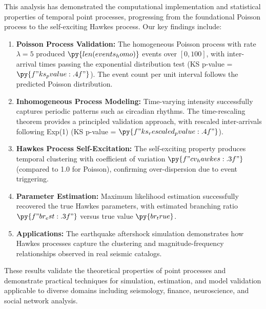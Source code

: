 \documentclass[a4paper, 11pt]{article}
\begin{document}
This analysis has demonstrated the computational implementation and statistical
properties of temporal point processes, progressing from the foundational Poisson
process to the self-exciting Hawkes process. Our key findings include:

\begin{enumerate}
\item \textbf{Poisson Process Validation:} The homogeneous Poisson process with
rate $\lambda = 5$ produced $\py{len(events_homo)}$ events over $[0, 100]$, with
inter-arrival times passing the exponential distribution test (KS p-value =
$\py{f"{ks_pvalue:.4f}"}$). The event count per unit interval follows the predicted
Poisson distribution.

\item \textbf{Inhomogeneous Process Modeling:} Time-varying intensity successfully
captures periodic patterns such as circadian rhythms. The time-rescaling theorem
provides a principled validation approach, with rescaled inter-arrivals following
Exp(1) (KS p-value = $\py{f"{ks_rescaled_pvalue:.4f}"}$).

\item \textbf{Hawkes Process Self-Excitation:} The self-exciting property produces
temporal clustering with coefficient of variation $\py{f"{cv_hawkes:.3f}"}$ (compared
to 1.0 for Poisson), confirming over-dispersion due to event triggering.

\item \textbf{Parameter Estimation:} Maximum likelihood estimation successfully
recovered the true Hawkes parameters, with estimated branching ratio
$\py{f"{br_est:.3f}"}$ versus true value $\py{br_true}$.

\item \textbf{Applications:} The earthquake aftershock simulation demonstrates how
Hawkes processes capture the clustering and magnitude-frequency relationships observed
in real seismic catalogs.
\end{enumerate}

These results validate the theoretical properties of point processes and demonstrate
practical techniques for simulation, estimation, and model validation applicable to
diverse domains including seismology, finance, neuroscience, and social network analysis.
\end{document}
